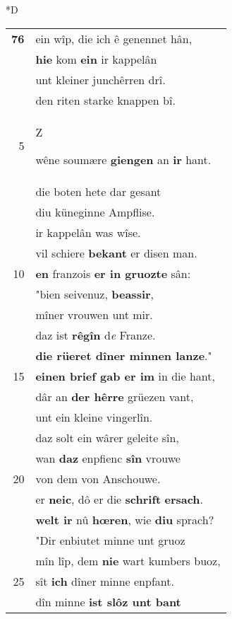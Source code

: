 \documentclass[8pt,a4paper,notitlepage]{article}
\begin{document}
\begin{table}[ht]
\begin{minipage}[t]{0.5\linewidth}
\small
\begin{center}*D
\end{center}
\begin{tabular}{rl}
\textbf{76} & ein wîp, die ich ê genennet hân,\\ 
 & \textbf{hie} kom \textbf{ein} ir kappelân\\ 
 & unt kleiner junchêrren drî.\\ 
 & den riten starke knappen bî.\\ 
5 & \begin{large}Z\end{large}wêne soumære \textbf{giengen} an \textbf{ir} hant.\\ 
 & die boten hete dar gesant\\ 
 & diu küneginne Ampflise.\\ 
 & ir kappelân was wîse.\\ 
 & vil schiere \textbf{bekant} er disen man.\\ 
10 & \textbf{en} franzois \textbf{er in gruozte} sân:\\ 
 & "bien seivenuz, \textbf{beassir},\\ 
 & mîner vrouwen unt mir.\\ 
 & daz ist \textbf{rêgîn} d\textit{e} Franze.\\ 
 & \textbf{die rüeret dîner minnen lanze}."\\ 
15 & \textbf{einen brief gab er im} in die hant,\\ 
 & dâr an \textbf{der hêrre} grüezen vant,\\ 
 & unt ein kleine vingerlîn.\\ 
 & daz solt ein wârer geleite sîn,\\ 
 & wan \textbf{daz} enpfienc \textbf{sîn} vrouwe\\ 
20 & von dem von Anschouwe.\\ 
 & er \textbf{neic}, dô er die \textbf{schrift} \textbf{ersach}.\\ 
 & \textbf{welt ir} nû \textbf{hœren}, wie \textbf{diu} sprach?\\ 
 & "Dir enbiutet minne unt gruoz\\ 
 & mîn lîp, dem \textbf{nie} wart kumbers buoz,\\ 
25 & sît \textbf{ich} dîner minne enpfant.\\ 
 & dîn minne \textbf{ist slôz unt bant}\\ 

\end{tabular}
\end{minipage}
\end{table}
\end{document}
